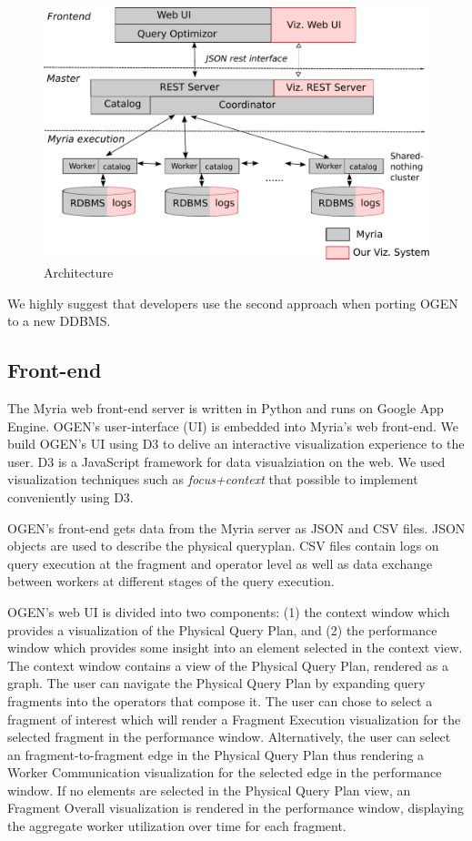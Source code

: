 \documentclass{chi2009}
\newcommand*{\system}{OGEN\xspace}
\newcommand*{\graph}{Physical Query Plan\xspace}
\newcommand*{\fragment}{Fragment Execution\xspace}
\newcommand*{\network}{Worker Communication\xspace}
\newcommand*{\overall}{Fragment Overall\xspace}
\begin{document}
\begin{figure}[ht]
  \includegraphics[width=\columnwidth]{images/viz_arch}
  \caption{Architecture}
  \label{fig:arch}
\end{figure}

We highly suggest that developers use the second approach when porting \system to a new DDBMS.

\subsection{Front-end}
The Myria web front-end server is written in Python and runs on Google App Engine. \system's user-interface (UI) is embedded into Myria's web front-end. We build \system's UI using D3 to delive an interactive visualization experience to the user. D3 is a JavaScript framework for data visualziation on the web. We used visualization techniques such as \emph{focus+context} that possible to implement conveniently using D3.

\system's front-end gets data from the Myria server as JSON and CSV files. JSON objects are used to describe the physical queryplan. CSV files contain logs on query execution at the fragment and operator level as well as data exchange between workers at different stages of the query execution.

\system's web UI is divided into two components: (1) the context window which provides a visualization of the \graph, and (2) the performance window which provides some insight into an element selected in the context view. The context window contains a view of the \graph, rendered as a graph. The user can navigate the \graph by expanding query fragments into the operators that compose it. The user can chose to select a fragment of interest which will render a \fragment visualization for the selected fragment in the performance window. Alternatively, the user can select an fragment-to-fragment edge in the \graph thus rendering a \network visualization for the selected edge in the performance window. If no elements are selected in the \graph view, an \overall visualization is rendered in the performance window, displaying the aggregate worker utilization over time for each fragment.
\end{document}
